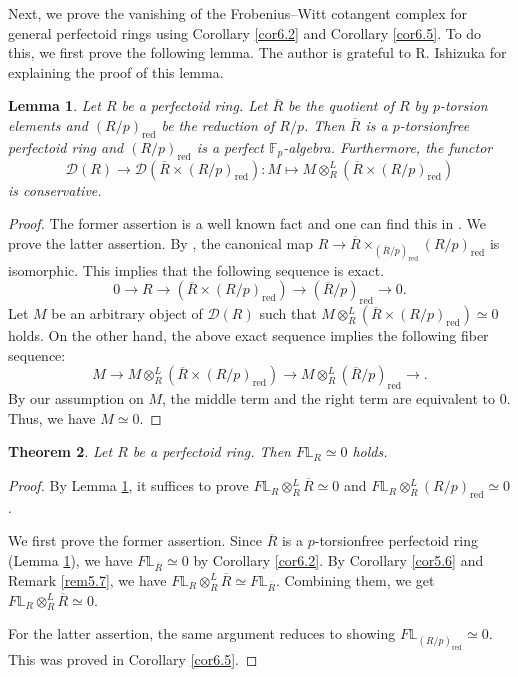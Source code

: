 \documentclass[11pt, a4paper]{amsart}
\theoremstyle{plain}
\newtheorem{theorem}{Theorem}[section]
\newtheorem{lemma}[theorem]{Lemma}
\theoremstyle{definition}
\begin{document}
Next, we prove the vanishing of the Frobenius--Witt cotangent complex for general perfectoid rings using Corollary \ref{cor6.2} and Corollary \ref{cor6.5}. To do this, we first prove the following lemma. The author is grateful to R. Ishizuka for explaining the proof of this lemma.
\begin{lemma}\label{lem6.6}
    Let $R$ be a perfectoid ring. Let $\overline R$ be the quotient of $R$ by $p$-torsion elements and $(R/p)_{\mathrm{red}}$ be the reduction of $R/p$. Then $\overline{R}$ is a $p$-torsionfree perfectoid ring and $(R/p)_{\mathrm{red}}$ is a perfect $\mathbb F_p$-algebra. Furthermore, the functor \[\mathcal{D}(R)\to \mathcal D(\overline{R}\times (R/p)_{\mathrm{red}}):M\mapsto M\otimes^L_R(\overline{R}\times (R/p)_{\mathrm{red}})\]
   is conservative.
\end{lemma}
\begin{proof}
    The former assertion is a well known fact and one can find this in \cite[\S 2.1.3]{CS24}. We prove the latter assertion. By \cite[\S 2.1.3]{CS24}, the canonical map $R\to \overline{R}\times_{(\overline{R}/p)_{\mathrm{red}}} (R/p)_{\mathrm{red}}$ is isomorphic. This implies that the following sequence is exact.\[0\to R\to (\overline{R}\times (R/p)_{\mathrm{red}})\to (\overline{R}/p)_{\mathrm{red}}\to 0.\] Let $M$ be an arbitrary object of $\mathcal D(R)$ such that $M\otimes_R^L(\overline{R}\times (R/p)_{\mathrm{red}})\simeq 0$ holds. On the other hand, the above exact sequence implies the following fiber sequence:\[M\to M\otimes^L_R(\overline{R}\times (R/p)_{\mathrm{red}})\to M\otimes^L_R(\overline{R}/p)_{\mathrm{red}}\to .\] By our assumption on $M$, the middle term and the right term are equivalent to $0$. Thus, we have $M\simeq 0$.
\end{proof}
\begin{theorem}\label{thm6.7}
    Let $R$ be a perfectoid ring. Then $F\mathbb L_R\simeq 0$ holds.
\end{theorem}
\begin{proof}
    By Lemma \ref{lem6.6}, it suffices to prove $F\mathbb L_R\otimes^L_R\overline{R}\simeq 0$ and $F\mathbb L_R\otimes^L_R(R/p)_{\mathrm{red}}\simeq 0$. 
    
    We first prove the former assertion. Since $\overline{R}$ is a $p$-torsionfree perfectoid ring (Lemma \ref{lem6.6}), we have $F\mathbb L_{\overline R}\simeq 0$ by Corollary \ref{cor6.2}. By Corollary \ref{cor5.6} and Remark \ref{rem5.7}, we have $F\mathbb L_{R}\otimes_R^L\overline{R}\simeq F\mathbb L_{\overline R}$. Combining them, we get $F\mathbb L_R\otimes_R^L\overline{R}\simeq 0$. 

    For the latter assertion, the same argument reduces to showing $F\mathbb L_{(R/p)_{\mathrm{red}}}\simeq 0$. This was proved in Corollary \ref{cor6.5}.
\end{proof}
\end{document}
